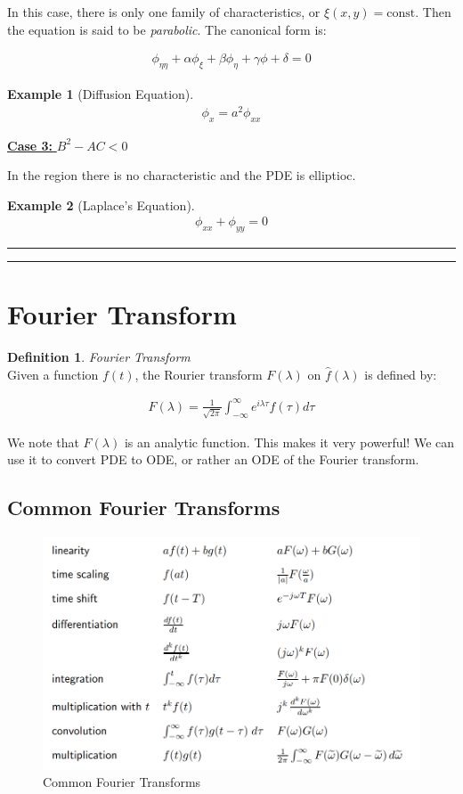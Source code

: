 \documentclass{article}
\newtheorem{ex}{Example}
\theoremstyle{definition}
\newtheorem{definition}{Definition}[section]
\newcommand{\Section}[1]{\hrule\hrule\section{#1}}
\newcommand{\Def}[2]{
\begin{shaded*}
\begin{definition}{\textit{#1}}\\#2\end{definition}
\end{shaded*}
}
\begin{document}
In this case, there is only one family of characteristics, or $\xi(x,y) = \text{const}$. Then the equation is said to be \textit{parabolic}. The canonical form is:

\begin{align*}
\phi_{\eta \eta} + \alpha \phi_\xi + \beta \phi_\eta + \gamma \phi + \delta = 0
\end{align*}

\begin{ex}[Diffusion Equation]

\begin{align*}
\phi_x = a^2 \phi_{xx}
\end{align*}
\end{ex}

\underline{\textbf{Case 3:} $B^2-AC < 0$}

In the region there is no characteristic and the PDE is elliptioc.

\begin{ex}[Laplace's Equation]
\begin{align*}
\phi_{xx} + \phi_{yy} = 0
\end{align*}
\end{ex}

\Section{Fourier Transform }

\Def{Fourier Transform}{Given a function $f(t)$, the Rourier transform $F(\lambda)$ on $\hat{f}(\lambda)$ is defined by:

\begin{align*}
F(\lambda) = \frac{1}{\sqrt{2\pi}} \int_{-\infty}^{\infty} e^{i \lambda \tau} f(\tau) d\tau
\end{align*}

We note that $F(\lambda)$ is an analytic function. This makes it very powerful! We can use it to convert PDE to ODE, or rather an ODE of the Fourier transform.
}

\subsection{Common Fourier Transforms}
\begin{figure}[H]
	\centering
	\includegraphics[width=0.7\linewidth]{common_fourier}
	\caption{Common Fourier Transforms}
	\label{fig:commonfourier}
\end{figure}
\end{document}
